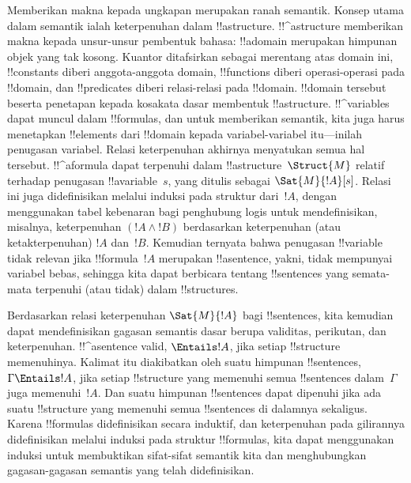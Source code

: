 \documentclass[../../../include/open-logic-section]{subfiles}
\begin{document}


Memberikan makna kepada ungkapan merupakan ranah semantik. Konsep utama
dalam semantik ialah keterpenuhan dalam !!a{structure}. !!^a{structure}
memberikan makna kepada unsur-unsur pembentuk bahasa: !!a{domain} merupakan
himpunan objek yang tak kosong. Kuantor ditafsirkan sebagai merentang atas
  domain ini, !!{constant}s diberi anggota-anggota domain, !!{function}s diberi
  operasi-operasi pada !!{domain}, dan !!{predicate}s diberi
relasi-relasi pada !!{domain}. !!{domain} tersebut beserta penetapan kepada
kosakata dasar membentuk !!a{structure}. !!^{variable}s dapat muncul dalam
!!{formula}s, dan untuk memberikan semantik, kita juga harus menetapkan
!!{element}s dari !!{domain} kepada variabel-variabel itu---inilah penugasan
variabel. Relasi keterpenuhan akhirnya menyatukan semua hal tersebut.
!!^a{formula} dapat terpenuhi dalam !!a{structure}~$\Struct{M}$ relatif
terhadap penugasan !!a{variable}~$s$, yang ditulis sebagai
$\Sat{M}{!A}[s]$. Relasi ini juga didefinisikan melalui induksi pada struktur
dari~$!A$, dengan menggunakan tabel kebenaran bagi penghubung logis untuk
mendefinisikan, misalnya, keterpenuhan $(!A \land !B)$ berdasarkan
keterpenuhan (atau ketakterpenuhan) $!A$ dan~$!B$. Kemudian ternyata bahwa
penugasan !!{variable} tidak relevan jika !!{formula}~$!A$ merupakan
!!a{sentence}, yakni, tidak mempunyai variabel bebas, sehingga kita dapat
berbicara tentang !!{sentence}s yang semata-mata terpenuhi (atau tidak)
dalam !!{structure}s.

Berdasarkan relasi keterpenuhan $\Sat{M}{!A}$ bagi !!{sentence}s, kita
kemudian dapat mendefinisikan gagasan semantis dasar berupa validitas,
perikutan, dan keterpenuhan. !!^a{sentence} valid, $\Entails !A$, jika setiap
!!{structure} memenuhinya. Kalimat itu diakibatkan oleh suatu himpunan
!!{sentence}s, $\Gamma \Entails !A$, jika setiap !!{structure} yang memenuhi
semua !!{sentence}s dalam~$\Gamma$ juga memenuhi~$!A$. Dan suatu himpunan
!!{sentence}s dapat dipenuhi jika ada suatu !!{structure} yang memenuhi
semua !!{sentence}s di dalamnya sekaligus. Karena !!{formula}s didefinisikan
secara induktif, dan keterpenuhan pada gilirannya didefinisikan melalui
induksi pada struktur !!{formula}s, kita dapat menggunakan induksi untuk
membuktikan sifat-sifat semantik kita dan menghubungkan gagasan-gagasan
semantis yang telah didefinisikan.
\end{document}
